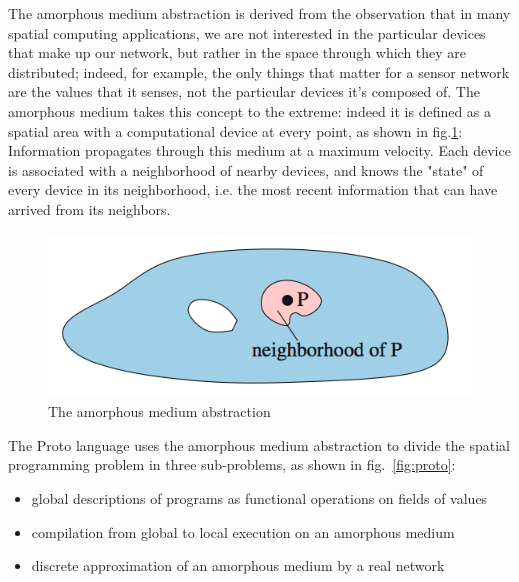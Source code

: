 The amorphous medium abstraction\cite{medium} is derived from the observation that in many spatial computing applications, we are not interested in the particular devices that make up our network, but rather in the space through which they are distributed; indeed, for example, the only things that matter for a sensor network are the values that it senses, not the particular devices it's composed of.
The amorphous medium\cite{medium} takes this concept to the extreme: indeed it is defined as a spatial area with a computational device at every point, as shown in fig.\ref{fig:medium}: Information propagates through this medium at a maximum velocity. Each device is associated with a neighborhood of nearby devices, and knows the "state" of every device in its neighborhood, i.e. the most recent information that can have arrived from its neighbors.



\begin{figure}[H]
  \centering
  \includegraphics[width=\linewidth]{pictures/ProtoMedium.png}
  \caption{The amorphous medium abstraction}
  \label{fig:medium}
\end{figure}



The Proto\cite{proto} language uses the amorphous medium abstraction\cite{medium} to divide the spatial programming problem in three sub-problems, as shown in fig.~\ref{fig:proto}:

\begin{itemize}
\itemsep2pt
\item{
global descriptions of programs as functional operations on fields of values
}
\item{
compilation from global to local execution on an amorphous medium
}
\item{
discrete approximation of an amorphous medium by a real network
}
\end{itemize}

\newpage

